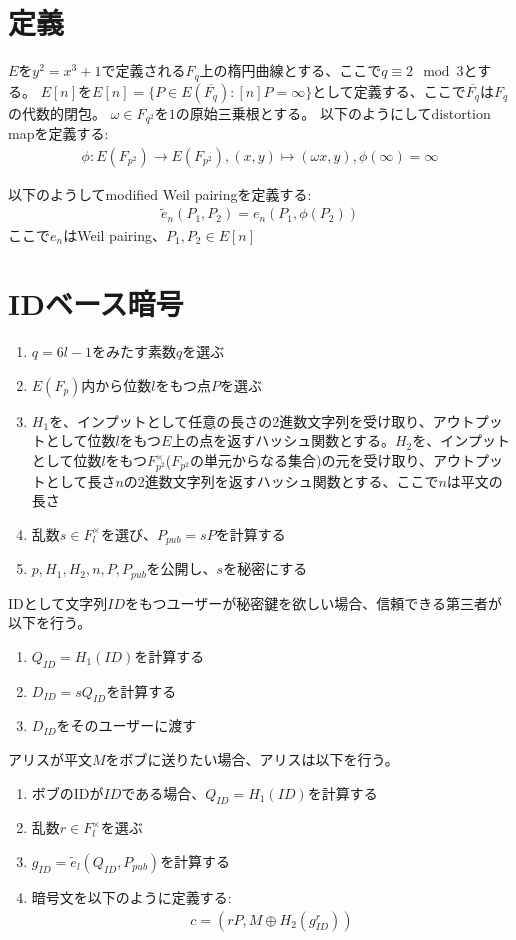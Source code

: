 \documentclass{jsarticle}
\begin{document}
\section{定義}
$E$を$y^{2} = x^{3} + 1$で定義される$F_{q}$上の楕円曲線とする、ここで$q \equiv 2 \mod 3$とする。
$E[n]$を$E[n] = \{P \in E(\overline{F_{q}}) : [n]P = \infty\}$として定義する、ここで$\overline{F_{q}}$は$F_{q}$の代数的閉包。
$\omega \in F_{q^{2}}$を$1$の原始三乗根とする。
以下のようにしてdistortion mapを定義する:
\begin{align*}
  \phi:E(F_{p^{2}}) \rightarrow E(F_{p^{2}}), (x,y) \mapsto (\omega x,y),\phi(\infty) = \infty
\end{align*}

以下のようしてmodified Weil pairingを定義する:
\begin{align*}
  \tilde{e}_{n}(P_{1},P_{2}) = e_n(P_{1},\phi(P_{2}))
\end{align*}
ここで$e_{n}$はWeil pairing、$P_{1},P_{2} \in E[n]$

\section{IDベース暗号}
\begin{enumerate}
\item $q = 6l - 1$をみたす素数$q$を選ぶ
\item $E(F_{p})$内から位数$l$をもつ点$P$を選ぶ
\item $H_{1}$を、インプットとして任意の長さの2進数文字列を受け取り、アウトプットとして位数$l$をもつ$E$上の点を返すハッシュ関数とする。$H_{2}$を、インプットとして位数$l$をもつ$F_{p^2}^{\times}$($F_{p^2}$の単元からなる集合)の元を受け取り、アウトプットとして長さ$n$の2進数文字列を返すハッシュ関数とする、ここで$n$は平文の長さ
\item 乱数$s \in F_{l}^{\times}$を選び、$P_{pub} = sP$を計算する
\item $p,H_{1},H_{2},n,P,P_{pub}$を公開し、$s$を秘密にする
\end{enumerate}

IDとして文字列$ID$をもつユーザーが秘密鍵を欲しい場合、信頼できる第三者が以下を行う。
\begin{enumerate}
\item $Q_{ID} = H_{1}(ID)$を計算する
\item $D_{ID} = sQ_{ID}$を計算する
\item $D_{ID}$をそのユーザーに渡す
\end{enumerate}

アリスが平文$M$をボブに送りたい場合、アリスは以下を行う。
\begin{enumerate}
\item ボブのIDが$ID$である場合、$Q_{ID} = H_{1}(ID)$を計算する
\item 乱数$r \in F_{l}^{\times}$を選ぶ
\item $g_{ID} = \tilde{e}_{l}(Q_{ID},P_{pub})$を計算する
\item 暗号文を以下のように定義する:
  \begin{align*}
    c = (rP,M \oplus H_{2}(g_{ID}^{r}))
  \end{align*}
\end{enumerate}
\end{document}
